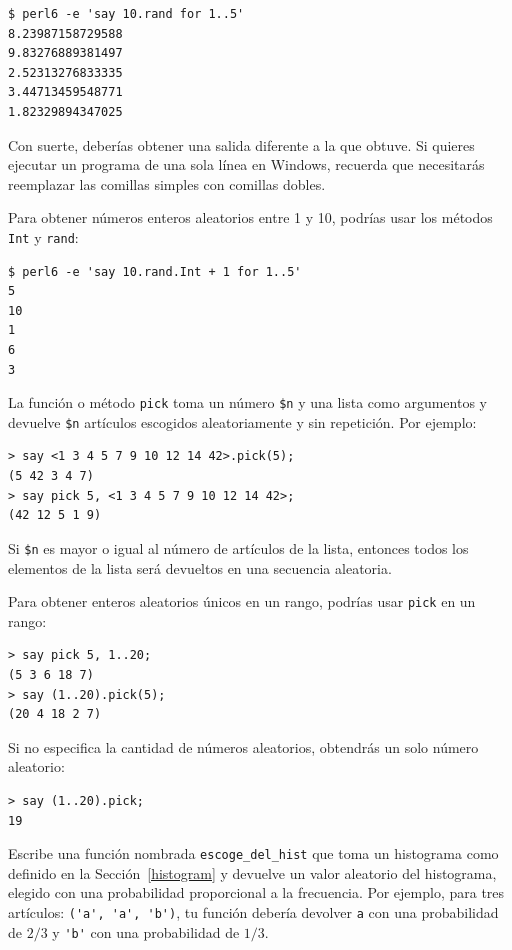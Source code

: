 \begin{verbatim}
$ perl6 -e 'say 10.rand for 1..5'
8.23987158729588
9.83276889381497
2.52313276833335
3.44713459548771
1.82329894347025
\end{verbatim}

Con suerte, deberías obtener una salida diferente a la que obtuve.
Si quieres ejecutar un programa de una sola línea en Windows,
recuerda que necesitarás reemplazar las comillas simples con comillas
dobles.

Para obtener números enteros aleatorios entre 1 y 10, podrías usar 
los métodos {\tt Int} y {\tt rand}:

\begin{verbatim}
$ perl6 -e 'say 10.rand.Int + 1 for 1..5'
5
10
1
6
3
\end{verbatim}

La función o método {\tt pick} toma un número \verb|$n| y una lista 
como argumentos y devuelve \verb|$n| artículos escogidos aleatoriamente
y sin repetición. Por ejemplo:

\begin{verbatim}
> say <1 3 4 5 7 9 10 12 14 42>.pick(5);
(5 42 3 4 7)
> say pick 5, <1 3 4 5 7 9 10 12 14 42>;
(42 12 5 1 9)
\end{verbatim}

Si \verb|$n| es mayor o igual al número de artículos de la lista,
entonces todos los elementos de la lista será devueltos en una
secuencia aleatoria.

Para obtener enteros aleatorios únicos en un rango, podrías usar
{\tt pick} en un rango:

\begin{verbatim}
> say pick 5, 1..20;
(5 3 6 18 7)
> say (1..20).pick(5);
(20 4 18 2 7)
\end{verbatim}

Si no especifica la cantidad de números aleatorios, obtendrás un
solo número aleatorio:

\begin{verbatim}
> say (1..20).pick;
19
\end{verbatim}
%


\begin{exercise}

Escribe una función nombrada \verb"escoge_del_hist" que toma un
histograma como definido en la Sección~\ref{histogram} y devuelve 
un valor aleatorio del histograma, elegido con una probabilidad 
proporcional a la frecuencia. Por ejemplo, para tres artículos:
\verb|('a', 'a', 'b')|, tu función debería devolver \verb|a| con una
probabilidad de $2/3$ y \verb|'b'| con una probabilidad de $1/3$.
\end{exercise}


